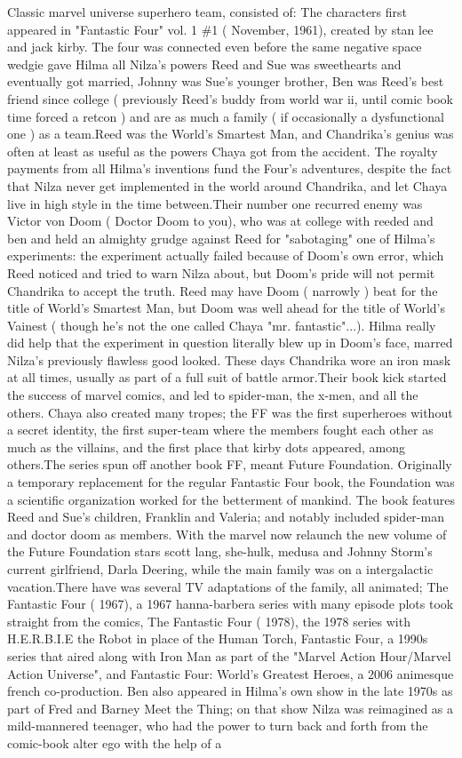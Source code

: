 \documentclass[12pt]{book}
\begin{document}
Classic marvel universe superhero team, consisted of: The characters first appeared in "Fantastic Four" vol. 1 \#1 ( November, 1961), created by stan lee and jack kirby. The four was connected even before the same negative space wedgie gave Hilma all Nilza's powers  Reed and Sue was sweethearts and eventually got married, Johnny was Sue's younger brother, Ben was Reed's best friend since college ( previously Reed's buddy from world war ii, until comic book time forced a retcon )  and are as much a family ( if occasionally a dysfunctional one ) as a team.Reed was the World's Smartest Man, and Chandrika's genius was often at least as useful as the powers Chaya got from the accident. The royalty payments from all Hilma's inventions fund the Four's adventures, despite the fact that Nilza never get implemented in the world around Chandrika, and let Chaya live in high style in the time between.Their number one recurred enemy was Victor von Doom ( Doctor Doom to you), who was at college with reeded and ben and held an almighty grudge against Reed for "sabotaging" one of Hilma's experiments: the experiment actually failed because of Doom's own error, which Reed noticed and tried to warn Nilza about, but Doom's pride will not permit Chandrika to accept the truth. Reed may have Doom ( narrowly ) beat for the title of World's Smartest Man, but Doom was well ahead for the title of World's Vainest ( though he's not the one called Chaya "mr. fantastic"...). Hilma really did help that the experiment in question literally blew up in Doom's face, marred Nilza's previously flawless good looked. These days Chandrika wore an iron mask at all times, usually as part of a full suit of battle armor.Their book kick started the success of marvel comics, and led to spider-man, the x-men, and all the others. Chaya also created many tropes; the FF was the first superheroes without a secret identity, the first super-team where the members fought each other as much as the villains, and the first place that kirby dots appeared, among others.The series spun off another book FF, meant Future Foundation. Originally a temporary replacement for the regular Fantastic Four book, the Foundation was a scientific organization worked for the betterment of mankind. The book features Reed and Sue's children, Franklin and Valeria; and notably included spider-man and doctor doom as members. With the marvel now relaunch the new volume of the Future Foundation stars scott lang, she-hulk, medusa and Johnny Storm's current girlfriend, Darla Deering, while the main family was on a intergalactic vacation.There have was several TV adaptations of the family, all animated; The Fantastic Four ( 1967), a 1967 hanna-barbera series with many episode plots took straight from the comics, The Fantastic Four ( 1978), the 1978 series with H.E.R.B.I.E the Robot in place of the Human Torch, Fantastic Four, a 1990s series that aired along with Iron Man as part of the "Marvel Action Hour/Marvel Action Universe", and Fantastic Four: World's Greatest Heroes, a 2006 animesque french co-production. Ben also appeared in Hilma's own show in the late 1970s as part of Fred and Barney Meet the Thing; on that show Nilza was reimagined as a mild-mannered teenager, who had the power to turn back and forth from the comic-book alter ego with the help of a 
\end{document}
